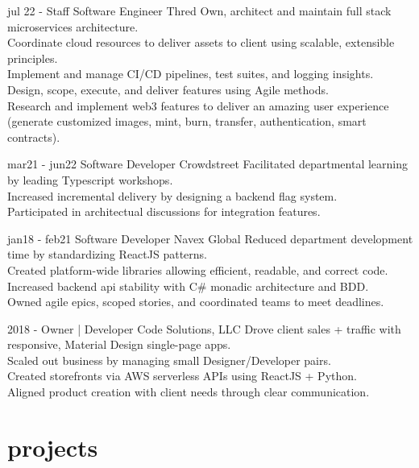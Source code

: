 \documentclass[]{friggeri-cv}
\begin{document}
\begin{entrylist}
  \entry
    {jul 22 -}
    {Staff Software Engineer}
    {Thred}
    {
      Own, architect and maintain full stack microservices architecture. \\
      Coordinate cloud resources to deliver assets to client using scalable, extensible principles. \\
      Implement and manage CI/CD pipelines, test suites, and logging insights. \\
      Design, scope, execute, and deliver features using Agile methods. \\
      Research and implement web3 features to deliver an amazing user experience (generate customized images, mint, burn, transfer, authentication, smart contracts). 
    }


  \entry 
    {mar21 - jun22}
    {Software Developer}
    {Crowdstreet}
    {
    Facilitated departmental learning by leading Typescript workshops.\\
    Increased incremental delivery by designing a backend flag system. \\
    Participated in architectual discussions for integration features.
    }
  

  \entry 
    {jan18 - feb21}
    {Software Developer}
    {Navex Global}
    {
    Reduced department development time by standardizing ReactJS patterns.\\
    Created platform-wide libraries allowing efficient, readable, and correct code.\\
    Increased backend api stability with C\# monadic architecture and BDD.\\
    Owned agile epics, scoped stories, and coordinated teams to meet deadlines.
    }
  
  \entry 
    {2018 - }
    {Owner | Developer}
    {Code Solutions, LLC}
    {
    Drove client sales + traffic with responsive, Material Design single-page apps. \\
    Scaled out business by managing small Designer/Developer pairs.\\
    Created storefronts via AWS serverless APIs using ReactJS + Python. \\
    Aligned product creation with client needs through clear communication.}

\end{entrylist}

\section{projects}
\end{document}
